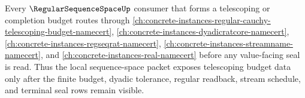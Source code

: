 Every $\RegularSequenceSpaceUp$ consumer that forms a telescoping or completion budget routes through \autoref{ch:concrete-instances-regular-cauchy-telescoping-budget-namecert}, \autoref{ch:concrete-instances-dyadicratcore-namecert}, \autoref{ch:concrete-instances-regseqrat-namecert}, \autoref{ch:concrete-instances-streamname-namecert}, and \autoref{ch:concrete-instances-real-namecert} before any value-facing seal is read. Thus the local sequence-space packet exposes telescoping budget data only after the finite budget, dyadic tolerance, regular readback, stream schedule, and terminal seal rows remain visible.
